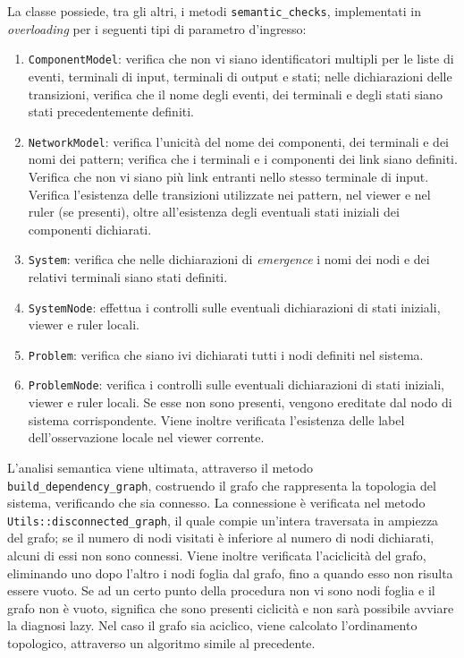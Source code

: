 La classe possiede, tra gli altri, i metodi \verb|semantic_checks|, implementati in \emph{overloading} per i seguenti tipi di parametro d'ingresso:
\begin{enumerate}
\item \verb|ComponentModel|: verifica che non vi siano identificatori multipli per le liste di eventi, terminali di input, terminali di output e stati; nelle dichiarazioni delle transizioni, verifica che il nome degli eventi, dei terminali e degli stati siano stati precedentemente definiti. 
\item \verb|NetworkModel|: verifica l'unicità del nome dei componenti, dei terminali e dei nomi dei pattern;
verifica che i terminali e i componenti dei link siano definiti. Verifica che non vi siano più link entranti nello stesso terminale di input. Verifica l'esistenza delle transizioni utilizzate nei pattern, nel viewer e nel ruler (se presenti), oltre all'esistenza degli eventuali stati iniziali dei componenti dichiarati.
\item \verb|System|: verifica che nelle dichiarazioni di \emph{emergence} i nomi dei nodi e dei relativi terminali siano stati definiti.
\item \verb|SystemNode|: effettua i controlli sulle eventuali dichiarazioni di stati iniziali, viewer e ruler locali.
\item \verb|Problem|: verifica che siano ivi dichiarati tutti i nodi definiti nel sistema.
\item \verb|ProblemNode|: verifica i controlli sulle eventuali dichiarazioni di stati iniziali, viewer e ruler locali. Se esse non sono presenti, vengono ereditate dal nodo di sistema corrispondente. Viene inoltre verificata l'esistenza delle label dell'osservazione locale nel viewer corrente.
\end{enumerate}
L'analisi semantica viene ultimata, attraverso il metodo \verb|build_dependency_graph|, costruendo il grafo che rappresenta la topologia del sistema, verificando che sia connesso. La connessione è verificata nel metodo \verb|Utils::disconnected_graph|, il quale compie un'intera traversata in ampiezza del grafo; se il numero di nodi visitati è inferiore al numero di nodi dichiarati, alcuni di essi non sono connessi. 
Viene inoltre verificata l'aciclicità del grafo, eliminando uno dopo l'altro i nodi foglia dal grafo, fino a quando esso non risulta essere vuoto. Se ad un certo punto della procedura non vi sono nodi foglia e il grafo non è vuoto, significa che sono presenti ciclicità e non sarà possibile avviare la diagnosi lazy.
Nel caso il grafo sia aciclico, viene calcolato l'ordinamento topologico, attraverso un algoritmo simile al precedente. 

